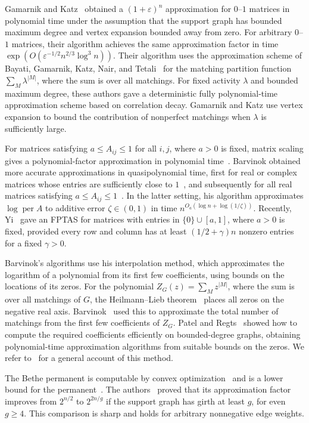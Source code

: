 \documentclass[11pt,reqno,letterpaper]{amsart}
\numberwithin{equation}{section}
\theoremstyle{definition}
\theoremstyle{remark}
\DeclareMathOperator{\per}{per}
\begin{document}
Gamarnik and Katz~\cite{GK} obtained a $(1+\varepsilon)^n$
approximation for $0$--$1$ matrices in polynomial time under
the assumption that the support graph has bounded maximum
degree and vertex expansion bounded away from zero.
For arbitrary $0$--$1$ matrices, their algorithm achieves
the same approximation factor in time
$\exp(O(\varepsilon^{-1/2}n^{2/3}\log^3 n))$. Their algorithm uses the approximation scheme of Bayati,
Gamarnik, Katz, Nair, and Tetali~\cite{BGKNT} for the matching
partition function $\sum_M\lambda^{|M|}$, where the sum is over
all matchings. For fixed activity $\lambda$ and bounded maximum
degree, these authors gave a deterministic fully polynomial-time
approximation scheme based on correlation decay.
Gamarnik and Katz use vertex expansion to bound the contribution of
nonperfect matchings when $\lambda$ is sufficiently large.

For matrices satisfying $a\le A_{ij}\le1$ for all $i,j$,
where $a>0$ is fixed, matrix scaling gives a polynomial-factor
approximation in polynomial time~\cite{LSW,BS}.
Barvinok obtained more accurate approximations in
quasipolynomial time, first for real or complex matrices
whose entries are sufficiently close to $1$~\cite{BarvinokComplex},
and subsequently for all real matrices satisfying
$a\le A_{ij}\le1$~\cite{BarvinokPermanents}.
In the latter setting, his algorithm approximates $\log\per A$
to additive error $\zeta\in(0,1)$ in time
$n^{O_a(\log n+\log(1/\zeta))}$. Recently, Yi~\cite{Yi2026} gave an FPTAS for matrices
with entries in $\{0\}\cup[a,1]$, where $a>0$ is fixed,
provided every row and column has at least $(1/2+\gamma)n$ nonzero
entries for a fixed $\gamma>0$. 

Barvinok's algorithms use his interpolation method, which
approximates the logarithm of a polynomial from its first few
coefficients, using bounds on the locations of its zeros.
For the polynomial $Z_G(z)=\sum_M z^{|M|}$, where the sum
is over all matchings of $G$, the Heilmann--Lieb
theorem~\cite{HL} places all zeros on the negative real axis.
Barvinok~\cite{BarvinokReal} used this to approximate the total
number of matchings from the first few coefficients of $Z_G$. Patel and Regts~\cite{PR} showed how to compute the required
coefficients efficiently on bounded-degree graphs, obtaining
polynomial-time approximation algorithms from suitable bounds
on the zeros. We refer to~\cite{Barvinok} for a general account
of this method.

The Bethe permanent is computable by convex
optimization~\cite{Vontobel} and is a lower bound for the
permanent~\cite{Gurvits}.
The authors~\cite{DJ} proved that its approximation factor
improves from $2^{n/2}$ to $2^{2n/g}$ if the support graph has
girth at least $g$, for even $g\ge4$.
This comparison is sharp and holds for arbitrary nonnegative
edge weights.
\end{document}
